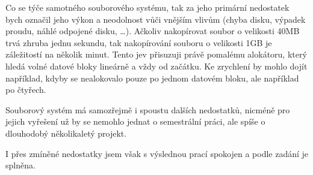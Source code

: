\documentclass[12pt, a4paper]{article}
\begin{document}
    Co se týče samotného souborového systému, tak za jeho primární nedostatek bych označil jeho výkon a neodolnost vůči vnějším vlivům (chyba disku, výpadek proudu, náhlé odpojené disku, \dots).
    Ačkoliv nakopírovat soubor o velikosti 40MB trvá zhruba jednu sekundu, tak nakopírování souboru o velikosti 1GB je záležitostí na několik minut.
    Tento jev přisuzuji právě pomalému alokátoru, který hledá volné datové bloky lineárně a vždy od začátku.
    Ke zrychlení by mohlo dojít například, kdyby se nealokovalo pouze po jednom datovém bloku, ale například po čtyřech.

    Souborový systém má samozřejmě i spoustu dalších nedostatků, nicméně pro jejich vyřešení už by se nemohlo jednat o semestrální práci, ale spíše o dlouhodobý několikaletý projekt.

    I přes zmíněné nedostatky jsem však s výslednou prací spokojen a podle zadání je splněna.

    \newpage
    \listoffigures
    
\end{document}
